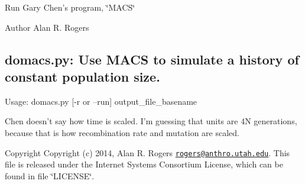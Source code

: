 Run Gary Chen's program, \char`\"{}\+M\+A\+C\+S\char`\"{}

\label{domacs_8py_domacs}%
\hypertarget{domacs_8py_domacs}{}%
 \begin{DoxyAuthor}{Author}
Alan R. Rogers \subsection*{domacs.\+py\+: Use M\+A\+C\+S to simulate a history of constant population size. }
\end{DoxyAuthor}


Usage\+: domacs.\+py \mbox{[}-\/r or --run\mbox{]} output\+\_\+file\+\_\+basename

Chen doesn't say how time is scaled. I'm guessing that units are 4\+N generations, because that is how recombination rate and mutation are scaled.

\begin{DoxyCopyright}{Copyright}
Copyright (c) 2014, Alan R. Rogers \href{mailto:rogers@anthro.utah.edu}{\tt rogers@anthro.\+utah.\+edu}. This file is released under the Internet Systems Consortium License, which can be found in file \char`\"{}\+L\+I\+C\+E\+N\+S\+E\char`\"{}. 
\end{DoxyCopyright}
